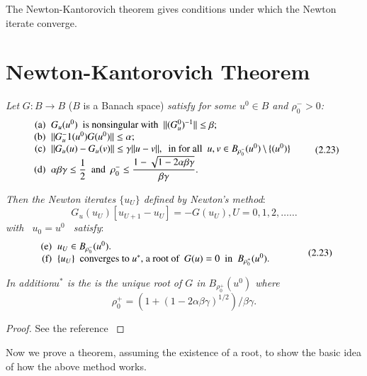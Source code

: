 The Newton-Kantorovich theorem gives conditions under which the Newton
iterate converge.  


\section{Newton-Kantorovich Theorem}\label{chap2-sec2.23}%

\textit{Let} $G : B \to B$ ($B$ is a Banach space) \textit{satisfy for some
$u^0 \in B$ and $\rho^-_0 > 0$:} 
\begin{equation*}
\begin{array}{r@{\;\;}l}
\text{(a)} & G_u (u^0) \text{ \ is nonsingular with \ } \|
  (G^0_u)^{-1}\| \leq \beta;\\  
\text{(b)} & \| G_u^-1(u^0) G (u^0) \| \leq \alpha;\\  
\text{(c)} & \| G_u(u) - G_u(v) \|\leq \gamma \| u-v \|, \text{ \ in
  for all \ } u, v \in B_{\rho^-_0} (u^0) \, \backslash \, \{ (u^0) \}\\  
\text{(d)} &  \alpha \beta \gamma \leq \dfrac{1}{2} \text{ \ and \ }
\rho^-_{0} \leq \dfrac{1 - \sqrt{1 - 2 \alpha \beta
    \gamma}}{\beta\gamma}.
\end{array}\tag{2.23}\label{chap2-sec2.23-eq2.23}
\end{equation*}

\textit{Then the Newton iterates $\{u_U\}$ defined by Newton's
  method}:
$$
G_u(u_U) [u_{U+1} - u_U] = - G(u_U), U = 0,1,2, \ldots\ldots
$$ 
\textit{with \ $u_0 = u^0$ \ satisfy}:
\begin{equation*}
\begin{array}{r@{\;\;}>{$}p{8cm}<{$}}   
\text{(e)} & u_U \in B_{\rho^-_0} (u^0).\\   
\text{(f)} & \{ u_U\} \text{ \ converges to $u^*$, a root of \ }
  G(u)= 0 \text{ \ in \ } B_{\rho^+_0} (u^0).
\end{array}\tag{2.23}\label{chap2-sec2.23-addeq2.23}
\end{equation*}

\textit{In addition\pageoriginale  $u^*$ is the is
  the unique root of $G$ in $B_{\rho^+_0} (u^0)$ where}
$$ 
\rho^+_0= (1+(1-2\alpha \beta \gamma )^{1/2})/\beta \gamma.
$$

\begin{proof}
See the reference \cite{key16}
\end{proof}

Now we prove a theorem, assuming the existence of a root, to show the
basic idea of how the above method works.  

